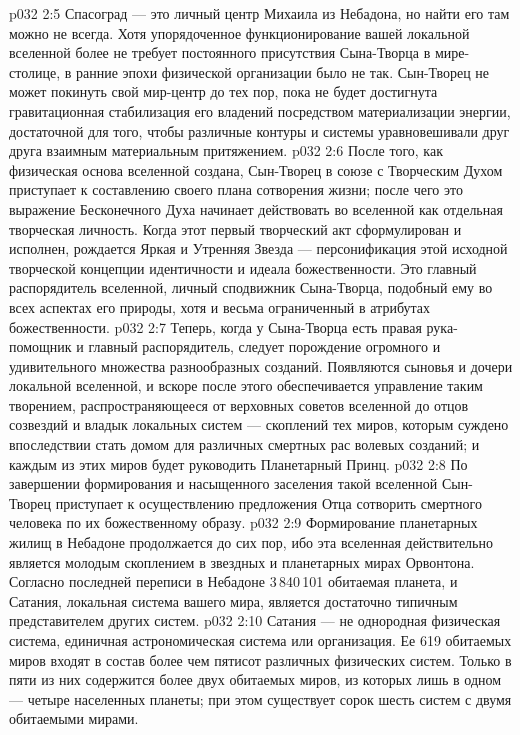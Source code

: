 \vs p032 2:5 Спасоград --- это личный центр Михаила из Небадона, но найти его там можно не всегда. Хотя упорядоченное функционирование вашей локальной вселенной более не требует постоянного присутствия Сына\hyp{}Творца в мире\hyp{}столице, в ранние эпохи физической организации было не так. Сын\hyp{}Творец не может покинуть свой мир\hyp{}центр до тех пор, пока не будет достигнута гравитационная стабилизация его владений посредством материализации энергии, достаточной для того, чтобы различные контуры и системы уравновешивали друг друга взаимным материальным притяжением.
\vs p032 2:6 \pc После того, как физическая основа вселенной создана, Сын\hyp{}Творец в союзе с Творческим Духом приступает к составлению своего плана сотворения жизни; после чего это выражение Бесконечного Духа начинает действовать во вселенной как отдельная творческая личность. Когда этот первый творческий акт сформулирован и исполнен, рождается Яркая и Утренняя Звезда --- персонификация этой исходной творческой концепции идентичности и идеала божественности. Это главный распорядитель вселенной, личный сподвижник Сына\hyp{}Творца, подобный ему во всех аспектах его природы, хотя и весьма ограниченный в атрибутах божественности.
\vs p032 2:7 Теперь, когда у Сына\hyp{}Творца есть правая рука\hyp{}помощник и главный распорядитель, следует порождение огромного и удивительного множества разнообразных созданий. Появляются сыновья и дочери локальной вселенной, и вскоре после этого обеспечивается управление таким творением, распространяющееся от верховных советов вселенной до отцов созвездий и владык локальных систем --- скоплений тех миров, которым суждено впоследствии стать домом для различных смертных рас волевых созданий; и каждым из этих миров будет руководить Планетарный Принц.
\vs p032 2:8 По завершении формирования и насыщенного заселения такой вселенной Сын\hyp{}Творец приступает к осуществлению предложения Отца сотворить смертного человека по их божественному образу.
\vs p032 2:9 \pc Формирование планетарных жилищ в Небадоне продолжается до сих пор, ибо эта вселенная действительно является молодым скоплением в звездных и планетарных мирах Орвонтона. Согласно последней переписи в Небадоне 3\,840\,101 обитаемая планета, и Сатания, локальная система вашего мира, является достаточно типичным представителем других систем.
\vs p032 2:10 Сатания --- не однородная физическая система, единичная астрономическая система или организация. Ее 619 обитаемых миров входят в состав более чем пятисот различных физических систем. Только в пяти из них содержится более двух обитаемых миров, из которых лишь в одном --- четыре населенных планеты; при этом существует сорок шесть систем с двумя обитаемыми мирами.
